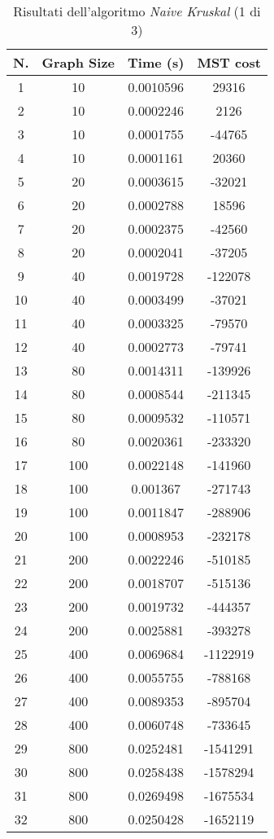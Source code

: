 \begin{table}[H]
	\centering
	\begin{tabular}{|c|c|c|c|}
		\hline
		\textbf{N.} & \textbf{Graph Size} & \textbf{Time (s)} & \textbf{MST cost}\\ 
		\hline
		1 & 10 & 0.0010596 & 29316\\
		\hline
		2 & 10 & 0.0002246 & 2126\\
		\hline
		3 & 10 & 0.0001755 & -44765\\
		\hline
		4 & 10 & 0.0001161 & 20360\\
		\hline\hline
		5 & 20 & 0.0003615 & -32021\\
		\hline
		6 & 20 & 0.0002788 & 18596\\
		\hline
		7 & 20 & 0.0002375 & -42560\\
		\hline
		8 & 20 & 0.0002041 & -37205\\
		\hline\hline
		9 & 40 & 0.0019728 & -122078\\
		\hline
		10 & 40 & 0.0003499 & -37021\\
		\hline
		11 & 40 & 0.0003325 & -79570\\
		\hline
		12 & 40 & 0.0002773 & -79741\\
		\hline\hline
		13 & 80 & 0.0014311 & -139926\\
		\hline
		14 & 80 & 0.0008544 & -211345\\
		\hline
		15 & 80 & 0.0009532 & -110571\\
		\hline
		16 & 80 & 0.0020361 & -233320\\
		\hline\hline
		17 & 100 & 0.0022148 & -141960\\
		\hline
		18 & 100 & 0.001367 & -271743\\
		\hline
		19 & 100 & 0.0011847 & -288906\\
		\hline
		20 & 100 & 0.0008953 & -232178\\
		\hline\hline
		21 & 200 & 0.0022246 & -510185\\
		\hline
		22 & 200 & 0.0018707 & -515136\\
		\hline
		23 & 200 & 0.0019732 & -444357\\
		\hline
		24 & 200 & 0.0025881 & -393278\\
		\hline\hline
		25 & 400 & 0.0069684 & -1122919\\
		\hline
		26 & 400 & 0.0055755 & -788168\\
		\hline
		27 & 400 & 0.0089353 & -895704\\
		\hline
		28 & 400 & 0.0060748 & -733645\\
		\hline\hline
		29 & 800 & 0.0252481 & -1541291\\
		\hline
		30 & 800 & 0.0258438 & -1578294\\
		\hline
		31 & 800 & 0.0269498 & -1675534\\
		\hline
		32 & 800 & 0.0250428 & -1652119\\
		\hline
	\end{tabular}
\caption{Risultati dell'algoritmo \textit{Naive Kruskal} (1 di 3)}
\end{table}
		
